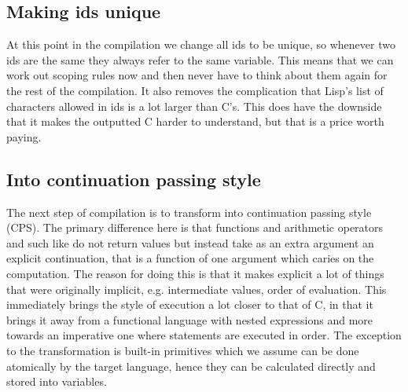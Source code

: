 \documentclass[a4paper]{article}
\begin{document}

\subsection{Making ids unique}

At this point in the compilation we change all ids to be unique, so whenever two ids are the same they always refer to the same variable. This means that we can work out scoping rules now and then never have to think about them again for the rest of the compilation. It also removes the complication that Lisp's list of characters allowed in ids is a lot larger than C's. This does have the downside that it makes the outputted C harder to understand, but that is a price worth paying.




\subsection{Into continuation passing style}

The next step of compilation is to transform into continuation passing style (CPS). The primary difference here is that functions and arithmetic operators and such like do not return values but instead take as an extra argument an explicit continuation, that is a function of one argument which caries on the computation. The reason for doing this is that it makes explicit a lot of things that were originally implicit, e.g. intermediate values, order of evaluation. This immediately brings the style of execution a lot closer to that of C, in that it brings it away from a functional language with nested expressions and more towards an imperative one where statements are executed in order. The exception to the transformation is built-in primitives which we assume can be done atomically by the target language, hence they can be calculated directly and stored into variables.
\end{document}
